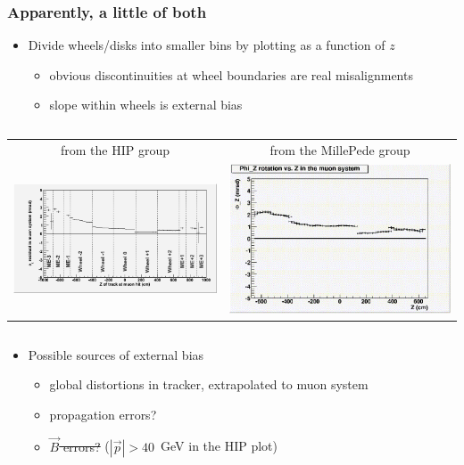 \documentclass[compress]{beamer}
\begin{document}
\begin{frame}
\frametitle{Apparently, a little of both}
\begin{itemize}
\item Divide wheels/disks into smaller bins by plotting as a function of $z$
\begin{itemize}
\item obvious discontinuities at wheel boundaries are real \mbox{misalignments\hspace{-1 cm}}
\item slope within wheels is external bias
\end{itemize}
\end{itemize}

\begin{columns}
\begin{tabular}{c c}
\scriptsize from the HIP group & \scriptsize from the MillePede group \\
\includegraphics[height=3.4 cm]{phiresid_from_muon.png} & \includegraphics[height=3.4 cm]{phiresid_vs_z_millepede.png}
\end{tabular}
\end{columns}

\begin{itemize}
\item Possible sources of external bias
\begin{itemize}\setlength{\itemsep}{0.1 cm}
\item global distortions in tracker, extrapolated to muon system
\item propagation errors?
\item \sout{$\vec{B}$ errors?} ($|\vec{p}| > 40$~GeV in the HIP plot)
\end{itemize}
\end{itemize}
\end{frame}
\end{document}
